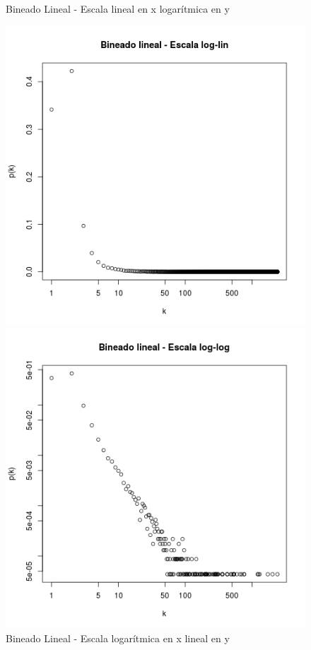 \documentclass{article}
\begin{document}
\begin{figure}[!htb]
\begin{minipage}{0.3\textwidth}
	\caption{Bineado Lineal - Escala lineal en x logarítmica en y}
	\label{pt3linlinlog}
   \end{minipage}\hfill
   \begin{minipage}{0.3\textwidth}
	\centering
	\includegraphics[width=1.0\linewidth]{Imagenes_P3/P3_binlin_loglin.png}
	\caption{Bineado Lineal - Escala logarítmica en x lineal en y}
	\label{pt3linloglin}
   \end{minipage}\hfill
      \begin{minipage}{0.3\textwidth}
	\centering
	\includegraphics[width=1.0\linewidth]{Imagenes_P3/P3_binlin_loglog.png}

\end{minipage}
\end{figure}
\end{document}
